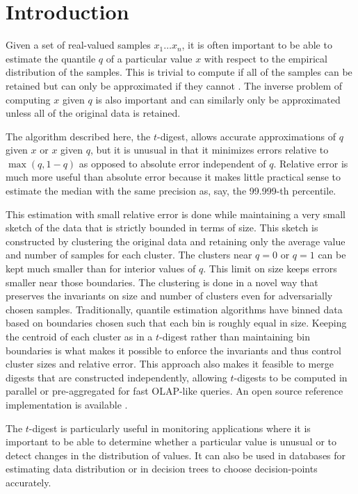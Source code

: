 \documentclass{vldb}
\begin{document}
\section{Introduction}
Given a set of real-valued samples $x_1 \ldots x_n$, it is often important to be able to estimate the quantile $q$ of a particular value $x$ with respect to the empirical distribution of the samples. This is trivial to compute if all of the samples can be retained but can only be approximated if they cannot \cite{munro1980}. The inverse problem of computing $x$ given $q$ is also important and  can similarly only be approximated unless all of the original data is retained.

The algorithm described here, the $t$-digest, allows accurate approximations of $q$ given $x$ or $x$ given $q$, but it is unusual in that it minimizes errors relative to $\max(q, 1-q)$ as opposed to  absolute error independent of $q$. Relative error is much more useful than absolute error because it makes little practical sense to estimate the median with the same precision as, say, the 99.999-th percentile.

This estimation with small relative error is done while maintaining a very small sketch of the data that is strictly bounded in terms of size. This  sketch is constructed by clustering the original data and retaining only the average value and number of samples for each cluster. The clusters near $q=0$ or $q=1$ can be kept much smaller than for interior values of $q$. This limit on size keeps errors  smaller near those boundaries. The clustering is done in a novel way that preserves the invariants on size and number of clusters even for adversarially chosen samples. Traditionally, quantile estimation algorithms have binned data based on boundaries chosen such that each bin is roughly equal in size. 
Keeping the centroid of each cluster as in a $t$-digest rather than maintaining bin boundaries is what makes it possible to enforce the invariants and thus control cluster sizes and relative error. This approach also 
 makes it feasible to merge digests that are constructed independently, allowing $t$-digests to be computed in parallel or pre-aggregated for fast OLAP-like queries. An open source reference implementation is available \cite{t-digest-project}.

The $t$-digest is particularly useful in monitoring applications where it is important to be able to determine whether a particular value is unusual or to detect changes in the distribution of values. It can also be used in databases for estimating data distribution or in decision trees to choose decision-points accurately.
\end{document}

